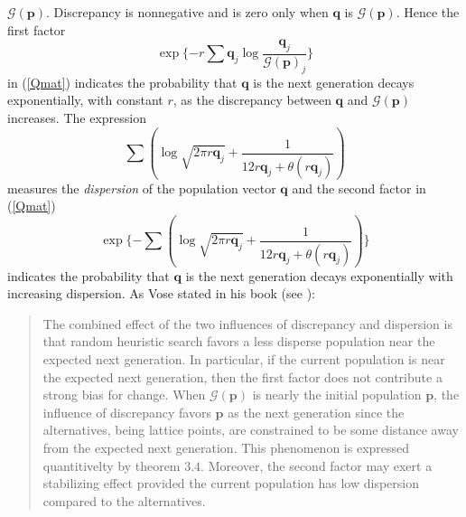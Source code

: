 $\mathcal{G}(\bm{p})$. Discrepancy is nonnegative and is zero only when $\bm{q}$ is $\mathcal{G}(\bm{p})$. Hence the first factor 
\[
\exp\{-r \sum \bm{q}_j \log \frac{\bm{q}_j}{\mathcal{G}(\bm{p})_j}\}
\]
in (\ref{Qmat}) indicates the probability that $\bm{q}$ is the next generation
decays exponentially, with constant $r$, as the discrepancy between $\bm{q}$ and $\mathcal{G}(\bm{p})$ increases.
The expression 
\[
\sum (\log \sqrt{2 \pi r\bm{q}_j} + \frac{1}{12r\bm{q}_j + \theta (r\bm{q}_j)})
\]
measures the {\em dispersion} of the population vector $\bm{q}$ and the second factor in (\ref{Qmat}) 
\[
\exp\{- \sum (\log \sqrt{2 \pi r\bm{q}_j} + \frac{1}{12r\bm{q}_j + \theta (r\bm{q}_j)})\}
\]
indicates the probability that $\bm{q}$ is the next generation decays exponentially with increasing dispersion. 
As Vose stated in his book (see \cite{Vose1999}):
\begin{quote}
The combined effect of the two influences of discrepancy and dispersion is that random heuristic search favors a less disperse 
population near the expected next generation. In particular, if the current population is near the expected next generation, 
then the first factor does not contribute a strong bias for change. When $\mathcal{G}(\bm{p})$ is nearly the initial population 
$\bm{p}$, the influence of discrepancy favors $\bm{p}$ as the next generation since the alternatives, being lattice points, 
are constrained to be some distance away from the expected next generation. This phenomenon is expressed quantitivelty by theorem $3.4$.
Moreover, the second factor may exert a stabilizing effect provided the current population has low dispersion compared to the alternatives.
\end{quote}

